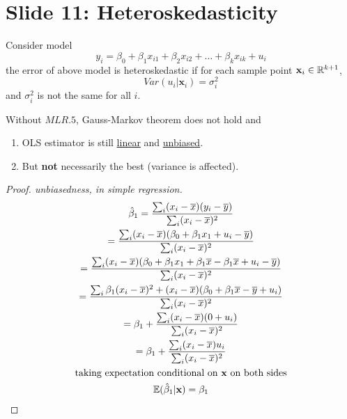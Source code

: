 \documentclass[]{article}
\begin{document}
	\section{Slide 11: Heteroskedasticity}
		\begin{definition}
			Consider model 
			\[
				y_i = \beta_0 + \beta_1 x_{i1} + \beta_2 x_{i2} + \dots + \beta_k x_{ik} + u_i
			\]
			the error of above model is heteroskedastic if for each sample point $\textbf{x}_i \in \mathbb{R}^{k+1}$, 
			\[
				Var(u_i | \textbf{x}_i) = \sigma_i^2
			\]
			and $\sigma_i^2$ is not the same for all $i$.
		\end{definition}
		\begin{remark}[Consequence]
			Without $MLR.5$, Gauss-Markov theorem does not hold and 
			\begin{enumerate}
				\item OLS estimator is still \ul{linear} and \ul{unbiased}.
				\item But \textbf{not} necessarily the best (variance is affected).
			\end{enumerate}
		\end{remark}
		\begin{proof}[Proof. unbiasedness, in simple regression]
			\begin{gather*}
				\hat{\beta}_1 = \frac{\sum_i(x_i - \overline{x})(y_i - \overline{y})}{\sum_i(x_i - \overline{x})^2} \\
				= \frac{\sum_i(x_i - \overline{x})(\beta_0 + \beta_1 x_1 + u_i - \overline{y})}{\sum_i(x_i - \overline{x})^2} \\
				= \frac{\sum_i(x_i - \overline{x})(\beta_0 + \beta_1 x_1 + \beta_1 \overline{x} - \beta_1 \overline{x} + u_i - \overline{y})}{\sum_i(x_i - \overline{x})^2} \\
				= \frac{\sum_i \beta_1 (x_i - \overline{x})^2 + (x_i - \overline{x}) (\beta_0 + \beta_1 \overline{x} - \overline{y} + u_i)}{\sum_i(x_i - \overline{x})^2} \\
				= \beta_1 + \frac{\sum_i (x_i - \overline{x}) (0 + u_i)}{\sum_i (x_i - \overline{x})^2} \\
				= \beta_1 + \frac{\sum_i (x_i - \overline{x})u_i}{\sum_i (x_i - \overline{x})^2} \\
				\text{{taking expectation conditional on \textbf{x} on both sides}} \\
				\mathbb{E}({\hat{\beta}_1|\textbf{x}}) = \beta_1 
			\end{gather*}
		\end{proof}
		
\end{document}
